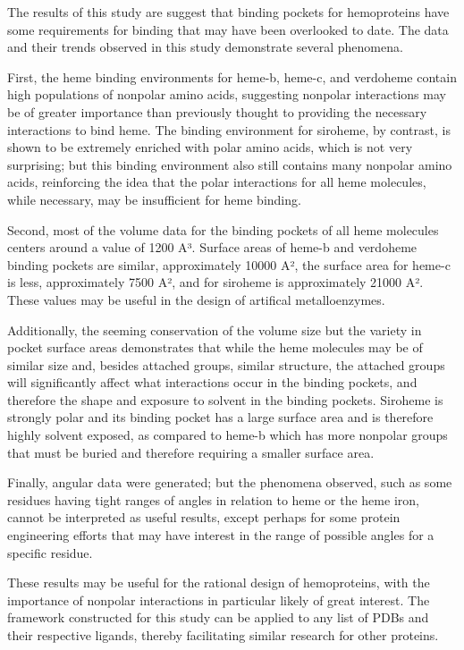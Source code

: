\documentclass[a4paper, nobind]{templates/ociamthesis}
\begin{document}
The results of this study are suggest that binding pockets for hemoproteins have some requirements for binding that may have been overlooked to date. The data and their trends observed in this study demonstrate several phenomena.

First, the heme binding environments for heme-b, heme-c, and verdoheme contain high populations of nonpolar amino acids, suggesting nonpolar interactions may be of greater importance than previously thought to providing the necessary interactions to bind heme. The binding environment for siroheme, by contrast, is shown to be extremely enriched with polar amino acids, which is not very surprising; but this binding environment also still contains many nonpolar amino acids, reinforcing the idea that the polar interactions for all heme molecules, while necessary, may be insufficient for heme binding.

Second, most of the volume data for the binding pockets of all heme molecules centers around a value of 1200 A³. Surface areas of heme-b and verdoheme binding pockets are similar, approximately 10000 A², the surface area for heme-c is less, approximately 7500 A², and for siroheme is approximately 21000 A². These values may be useful in the design of artifical metalloenzymes.

Additionally, the seeming conservation of the volume size but the variety in pocket surface areas demonstrates that while the heme molecules may be of similar size and, besides attached groups, similar structure, the attached groups will significantly affect what interactions occur in the binding pockets, and therefore the shape and exposure to solvent in the binding pockets. Siroheme is strongly polar and its binding pocket has a large surface area and is therefore highly solvent exposed, as compared to heme-b which has more nonpolar groups that must be buried and therefore requiring a smaller surface area.

Finally, angular data were generated; but the phenomena observed, such as some residues having tight ranges of angles in relation to heme or the heme iron, cannot be interpreted as useful results, except perhaps for some protein engineering efforts that may have interest in the range of possible angles for a specific residue.

These results may be useful for the rational design of hemoproteins, with the importance of nonpolar interactions in particular likely of great interest. The framework constructed for this study can be applied to any list of PDBs and their respective ligands, thereby facilitating similar research for other proteins.
\end{document}
